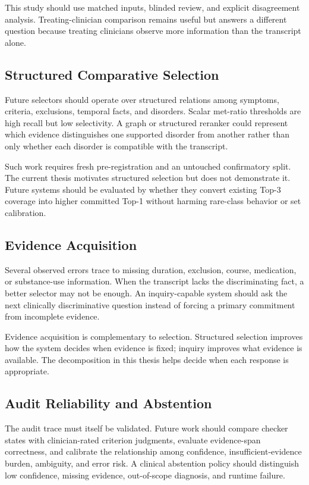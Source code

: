 This study should use matched inputs, blinded review, and explicit disagreement analysis. Treating-clinician comparison remains useful but answers a different question because treating clinicians observe more information than the transcript alone.

\subsection{Structured Comparative Selection}

Future selectors should operate over structured relations among symptoms, criteria, exclusions, temporal facts, and disorders. Scalar met-ratio thresholds are high recall but low selectivity. A graph or structured reranker could represent which evidence distinguishes one supported disorder from another rather than only whether each disorder is compatible with the transcript.

Such work requires fresh pre-registration and an untouched confirmatory split. The current thesis motivates structured selection but does not demonstrate it. Future systems should be evaluated by whether they convert existing Top-3 coverage into higher committed Top-1 without harming rare-class behavior or set calibration.

\subsection{Evidence Acquisition}

Several observed errors trace to missing duration, exclusion, course, medication, or substance-use information. When the transcript lacks the discriminating fact, a better selector may not be enough. An inquiry-capable system should ask the next clinically discriminative question instead of forcing a primary commitment from incomplete evidence.

Evidence acquisition is complementary to selection. Structured selection improves how the system decides when evidence is fixed; inquiry improves what evidence is available. The decomposition in this thesis helps decide when each response is appropriate.

\subsection{Audit Reliability and Abstention}

The audit trace must itself be validated. Future work should compare checker states with clinician-rated criterion judgments, evaluate evidence-span correctness, and calibrate the relationship among confidence, insufficient-evidence burden, ambiguity, and error risk. A clinical abstention policy should distinguish low confidence, missing evidence, out-of-scope diagnosis, and runtime failure.

